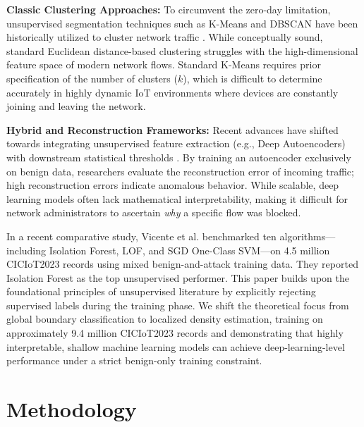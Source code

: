 \documentclass{article}
\begin{document}
\textbf{Classic Clustering Approaches:} To circumvent the zero-day limitation, unsupervised segmentation techniques such as K-Means and DBSCAN have been historically utilized to cluster network traffic \cite{kmeans_ids}. While conceptually sound, standard Euclidean distance-based clustering struggles with the high-dimensional feature space of modern network flows. Standard K-Means requires prior specification of the number of clusters ($k$), which is difficult to determine accurately in highly dynamic IoT environments where devices are constantly joining and leaving the network. 

\textbf{Hybrid and Reconstruction Frameworks:} Recent advances have shifted towards integrating unsupervised feature extraction (e.g., Deep Autoencoders) with downstream statistical thresholds \cite{kitsune2018}. By training an autoencoder exclusively on benign data, researchers evaluate the reconstruction error of incoming traffic; high reconstruction errors indicate anomalous behavior. While scalable, deep learning models often lack mathematical interpretability, making it difficult for network administrators to ascertain \textit{why} a specific flow was blocked. 

In a recent comparative study, Vicente et al. \cite{vicente2025} benchmarked ten algorithms---including Isolation Forest, LOF, and SGD One-Class SVM---on 4.5 million CICIoT2023 records using mixed benign-and-attack training data. They reported Isolation Forest as the top unsupervised performer. This paper builds upon the foundational principles of unsupervised literature by explicitly rejecting supervised labels during the training phase. We shift the theoretical focus from global boundary classification to localized density estimation, training on approximately 9.4 million CICIoT2023 records and demonstrating that highly interpretable, shallow machine learning models can achieve deep-learning-level performance under a strict benign-only training constraint.

\section{Methodology}
\end{document}
